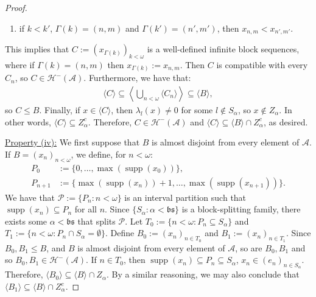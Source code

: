 \documentclass[10pt,a4paper]{amsart}
\theoremstyle{plain}
\numberwithin{equation}{section}
\theoremstyle{definition}
\newcommand{\func}{\operatorname}
\renewcommand{\c}[1]{\langle #1 \rangle}
\newcommand{\bigc}[1]{\left\langle #1 \right\rangle}
\newcommand{\Po}{\cal{P}}
\newcommand{\cal}{\mathcal}
\renewcommand{\frak}{\mathfrak}
\newcommand{\supp}{\func{supp}}
\newcommand{\A}{\cal{A}}
\renewcommand{\H}{\cal{H}}
\begin{document}
\begin{proof}
\begin{enumerate}
        \item if $k < k'$, $\Gamma(k) = (n,m)$ and $\Gamma(k') = (n',m')$, then $x_{n,m} < x_{n',m'}$.
    \end{enumerate}
    This implies that $C := (x_{\Gamma(k)})_{k<\omega}$ is a well-defined infinite block sequences, where if $\Gamma(k) = (n,m)$ then $x_{\Gamma(k)} := x_{n,m}$. Then $C$ is compatible with every $C_n$, so $C \in \H^-(\A)$. Furthermore, we have that:
    \begin{align*}
        \c{C} \subseteq \bigc{\bigcup_{n<\omega} \c{C_n}} \subseteq \c{B},
    \end{align*}
    so $C \leq B$. Finally, if $x \in \c{C}$, then $\lambda_l(x) \neq 0$ for some $l \notin S_\alpha$, so $x \notin Z_\alpha$. In other words, $\c{C} \subseteq Z_\alpha^c$. Therefore, $C \in \H^-(\A)$ and $\c{C} \subseteq \c{B} \cap Z_\alpha^c$, as desired.

    \underline{Property (iv):} We first suppose that $B$ is almost disjoint from every element of $\A$. If $B = (x_n)_{n<\omega}$, we define, for $n < \omega$:
    \begin{align*}
        P_0 &:= \{0,\dots,\max(\supp(x_0))\}, \\
        P_{n+1} &:= \{\max(\supp(x_n))+1,\dots,\max(\supp(x_{n+1}))\}.
    \end{align*}
    We have that $\Po := \{P_n : n < \omega\}$ is an interval partition such that $\supp(x_n) \subseteq P_n$ for all $n$. Since $\{S_\alpha : \alpha < \frak{bs}\}$ is a block-splitting family, there exists some $\alpha < \frak{bs}$ that splits $\Po$. Let $T_0 := \{n < \omega : P_n \subseteq S_\alpha\}$ and $T_1 := \{n < \omega : P_n \cap S_\alpha = \emptyset\}$. Define $B_0 := (x_n)_{n \in T_0}$ and $B_1 := (x_n)_{n \in T_1}$. Since $B_0,B_1 \leq B$, and $B$ is almost disjoint from every element of $\A$, so are $B_0,B_1$ and so $B_0,B_1 \in \H^-(\A)$. If $n \in T_0$, then $\supp(x_n) \subseteq P_n \subseteq S_\alpha$, $x_n \in (e_n)_{n \in S_\alpha}$. Therefore, $\c{B_0} \subseteq \c{B} \cap Z_\alpha$. By a similar reasoning, we may also conclude that $\c{B_1} \subseteq \c{B} \cap Z_\alpha^c$.


\end{proof}
\end{document}
